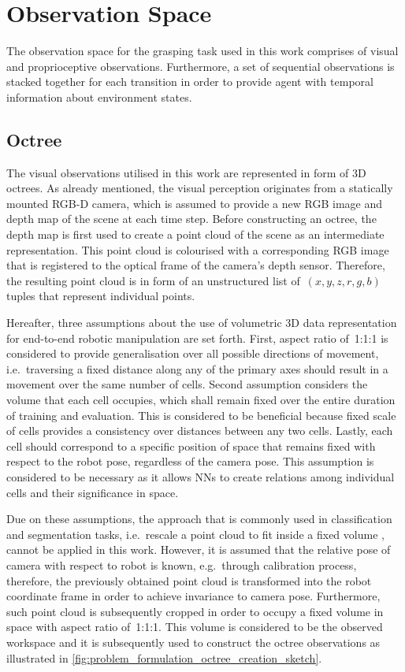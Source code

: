 \section{Observation Space}

The observation space for the grasping task used in this work comprises of visual and proprioceptive observations. Furthermore, a set of sequential observations is stacked together for each transition in order to provide agent with temporal information about environment states.


\subsection{Octree}\label{subsec:problem_formulation_octree}

The visual observations utilised in this work are represented in form of 3D octrees. As already mentioned, the visual perception originates from a statically mounted RGB-D camera, which is assumed to provide a new RGB image and depth map of the scene at each time step. Before constructing an octree, the depth map is first used to create a point cloud of the scene as an intermediate representation. This point cloud is colourised with a corresponding RGB image that is registered to the optical frame of the camera's depth sensor. Therefore, the resulting point cloud is in form of an unstructured list of~\((x,y,z,r,g,b)\) tuples that represent individual points.

Hereafter, three assumptions about the use of volumetric 3D data representation for end-to-end robotic manipulation are set forth. First, aspect ratio of~1:1:1 is considered to provide generalisation over all possible directions of movement, i.e.~traversing a fixed distance along any of the primary axes should result in a movement over the same number of cells. Second assumption considers the volume that each cell occupies, which shall remain fixed over the entire duration of training and evaluation. This is considered to be beneficial because fixed scale of cells provides a consistency over distances between any two cells. Lastly, each cell should correspond to a specific position of space that remains fixed with respect to the robot pose, regardless of the camera pose. This assumption is considered to be necessary as it allows NNs to create relations among individual cells and their significance in space.

Due on these assumptions, the approach that is commonly used in classification and segmentation tasks, i.e.~rescale a point cloud to fit inside a fixed volume \cite{wang_o-cnn_2017}, cannot be applied in this work. However, it is assumed that the relative pose of camera with respect to robot is known, e.g.~through calibration process, therefore, the previously obtained point cloud is transformed into the robot coordinate frame in order to achieve invariance to camera pose. Furthermore, such point cloud is subsequently cropped in order to occupy a fixed volume in space with aspect ratio of~1:1:1. This volume is considered to be the observed workspace and it is subsequently used to construct the octree observations as illustrated in \autoref{fig:problem_formulation_octree_creation_sketch}.

